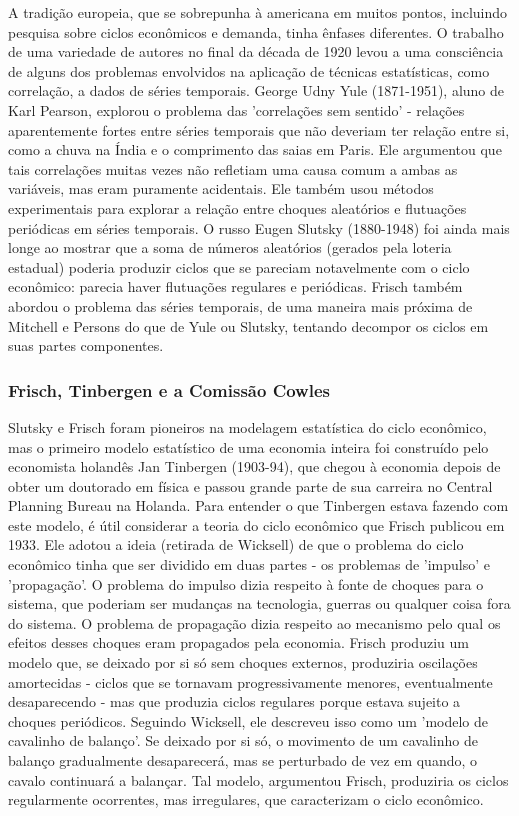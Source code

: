 \documentclass[12pt]{article}
\begin{document}
A tradição europeia, que se sobrepunha à americana em muitos pontos, incluindo pesquisa sobre ciclos econômicos e demanda, tinha ênfases diferentes. O trabalho de uma variedade de autores no final da década de 1920 levou a uma consciência de alguns dos problemas envolvidos na aplicação de técnicas estatísticas, como correlação, a dados de séries temporais. George Udny Yule (1871-1951), aluno de Karl Pearson, explorou o problema das 'correlações sem sentido' - relações aparentemente fortes entre séries temporais que não deveriam ter relação entre si, como a chuva na Índia e o comprimento das saias em Paris. Ele argumentou que tais correlações muitas vezes não refletiam uma causa comum a ambas as variáveis, mas eram puramente acidentais. Ele também usou métodos experimentais para explorar a relação entre choques aleatórios e flutuações periódicas em séries temporais. O russo Eugen Slutsky (1880-1948) foi ainda mais longe ao mostrar que a soma de números aleatórios (gerados pela loteria estadual) poderia produzir ciclos que se pareciam notavelmente com o ciclo econômico: parecia haver flutuações regulares e periódicas. Frisch também abordou o problema das séries temporais, de uma maneira mais próxima de Mitchell e Persons do que de Yule ou Slutsky, tentando decompor os ciclos em suas partes componentes.

\subsubsection{\textbf{Frisch, Tinbergen e a Comissão Cowles}}

Slutsky e Frisch foram pioneiros na modelagem estatística do ciclo econômico, mas o primeiro modelo estatístico de uma economia inteira foi construído pelo economista holandês Jan Tinbergen (1903-94), que chegou à economia depois de obter um doutorado em física e passou grande parte de sua carreira no Central Planning Bureau na Holanda. Para entender o que Tinbergen estava fazendo com este modelo, é útil considerar a teoria do ciclo econômico que Frisch publicou em 1933. Ele adotou a ideia (retirada de Wicksell) de que o problema do ciclo econômico tinha que ser dividido em duas partes - os problemas de 'impulso' e 'propagação'. O problema do impulso dizia respeito à fonte de choques para o sistema, que poderiam ser mudanças na tecnologia, guerras ou qualquer coisa fora do sistema. O problema de propagação dizia respeito ao mecanismo pelo qual os efeitos desses choques eram propagados pela economia. Frisch produziu um modelo que, se deixado por si só sem choques externos, produziria oscilações amortecidas - ciclos que se tornavam progressivamente menores, eventualmente desaparecendo - mas que produzia ciclos regulares porque estava sujeito a choques periódicos. Seguindo Wicksell, ele descreveu isso como um 'modelo de cavalinho de balanço'. Se deixado por si só, o movimento de um cavalinho de balanço gradualmente desaparecerá, mas se perturbado de vez em quando, o cavalo continuará a balançar. Tal modelo, argumentou Frisch, produziria os ciclos regularmente ocorrentes, mas irregulares, que caracterizam o ciclo econômico.
\end{document}
